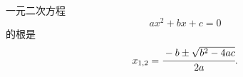 一元二次方程
\begin{displaymath}
  ax^2 + bx + c = 0
\end{displaymath}
的根是
\begin{displaymath}
  x_{1,2} = \cfrac{-b \pm \sqrt{b^2-4ac}}{2a}.
\end{displaymath}